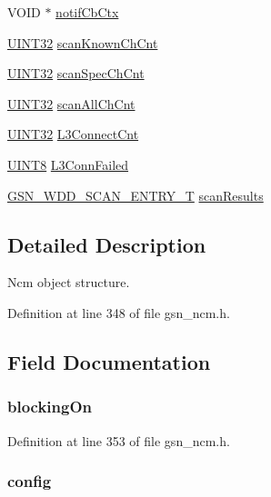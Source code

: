 \begin{DoxyCompactItemize}
\item 
VOID $\ast$ \hyperlink{a00158_a3b4dee05b0f332ef6668c044d86f1b28}{notifCbCtx}
\item 
\hyperlink{a00660_gae1e6edbbc26d6fbc71a90190d0266018}{UINT32} \hyperlink{a00158_af4d92408837352462c289af3d51b75d0}{scanKnownChCnt}
\item 
\hyperlink{a00660_gae1e6edbbc26d6fbc71a90190d0266018}{UINT32} \hyperlink{a00158_a6c1e7888f31f25a07d24138a8eea18ea}{scanSpecChCnt}
\item 
\hyperlink{a00660_gae1e6edbbc26d6fbc71a90190d0266018}{UINT32} \hyperlink{a00158_a6b765a8738e9378533592c4280256ca6}{scanAllChCnt}
\item 
\hyperlink{a00660_gae1e6edbbc26d6fbc71a90190d0266018}{UINT32} \hyperlink{a00158_ad41ce430e6b594b9786b7f4445b96ca2}{L3ConnectCnt}
\item 
\hyperlink{a00660_gab27e9918b538ce9d8ca692479b375b6a}{UINT8} \hyperlink{a00158_afbd204c961f5e9d7f9c19ed7bcedee06}{L3ConnFailed}
\item 
\hyperlink{a00400}{GSN\_\-WDD\_\-SCAN\_\-ENTRY\_\-T} \hyperlink{a00158_a6333e5f0ce7c1941fa1c766004fedf07}{scanResults}
\end{DoxyCompactItemize}


\subsection{Detailed Description}
Ncm object structure. 

Definition at line 348 of file gsn\_\-ncm.h.



\subsection{Field Documentation}
\hypertarget{a00158_ae88d491fc834aaae7cc9c066719d285b}{
\subsubsection[{blockingOn}]{ {\bf blockingOn}}}
\label{a00158_ae88d491fc834aaae7cc9c066719d285b}


Definition at line 353 of file gsn\_\-ncm.h.

\hypertarget{a00158_a5c9f4a124595ac5b08eebf1fd8ee601c}{
\subsubsection[{config}]{ {\bf config}}}
\label{a00158_a5c9f4a124595ac5b08eebf1fd8ee601c}


